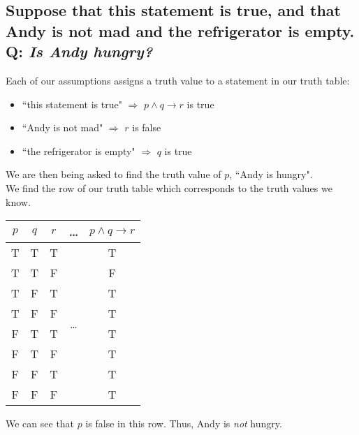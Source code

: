 \documentclass{article}
\begin{document}
\subsection*{{\normalsize Suppose that this statement is true, and that Andy is not mad and the refrigerator is empty.}\\
Q: {\em Is Andy hungry?}}
Each of our assumptions assigns a truth value to a statement in our truth table:
\begin{itemize}
\item ``this statement is true" $\Rightarrow$ $p\wedge q\to r$ is true
\item ``Andy is not mad" $\Rightarrow$ $r$ is false
\item ``the refrigerator is empty" $\Rightarrow$ $q$ is true
\end{itemize}
We are then being asked to find the truth value of $p$, ``Andy is hungry".\\[1ex]
We find the row of our truth table which corresponds to the truth values we know.
\begin{center}
\begin{tabular}{ccc|c|c}
$p$&$q$&$r$&\ldots&$p\wedge q\to r$\\\hline
T&T&T&\multirow{8}{*}{\ldots}&T\\
T&T&F&&F\\
T&F&T&&T\\
T&F&F&&T\\
F&T&T&&T\\
\color{red}F&\color{red}T&\color{red}F&&\color{red}T\\
F&F&T&&T\\
F&F&F&&T
\end{tabular}
\end{center}
We can see that $p$ is false in this row. Thus, Andy is \textit{not} hungry.
\end{document}
